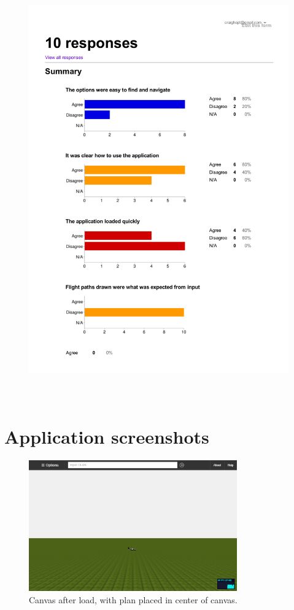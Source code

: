 \begin{figure}[h!]
    \includegraphics[width=15cm,height=18cm,page=3]{images/questionnaireResults.pdf}
\end{figure}

\clearpage

\section{Application screenshots}
\label{sec:complete}
\begin{figure}[h!]
    \centering
    \includegraphics[width=0.8\textwidth]{images/screen1.png}
    \caption{Canvas after load, with plan placed in center of canvas.}
\end{figure}


